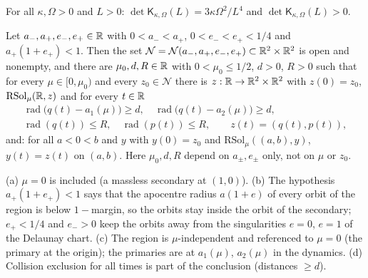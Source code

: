 \begin{theorem}\label{bpI:p0:kepler}
For all $\kappa,\Omega>0$ and $L>0$: $\det\mathsf K_{\kappa,\Omega}(L)=3\kappa\Omega^2/L^4$ and $\det\mathsf K_{\kappa,\Omega}(L)>0$.
\end{theorem}

\begin{theorem}\label{bpI:p0:r3bp}
Let $a_-,a_+,e_-,e_+\in\mathbb{R}$ with $0<a_-<a_+$, $0<e_-<e_+<1/4$ and $a_+(1+e_+)<1$. Then the set
$\mathcal N=\mathcal N(a_-,a_+,e_-,e_+)\subset\mathbb{R}^2\times\mathbb{R}^2$ is open and nonempty, and there are $\mu_0,d,R\in\mathbb{R}$ with
$0<\mu_0\le1/2$, $d>0$, $R>0$ such that for every $\mu\in[0,\mu_0)$ and every $z_0\in\mathcal N$ there is
$z:\mathbb{R}\to\mathbb{R}^2\times\mathbb{R}^2$ with $z(0)=z_0$, $\mathrm{RSol}_\mu(\mathbb{R},z)$ and for every $t\in\mathbb{R}$
\begin{gather*}
\operatorname{rad}\bigl(q(t)-a_1(\mu)\bigr)\ge d,\quad\operatorname{rad}\bigl(q(t)-a_2(\mu)\bigr)\ge d,\\
\operatorname{rad}(q(t))\le R,\quad\operatorname{rad}(p(t))\le R,\qquad z(t)=(q(t),p(t)),
\end{gather*}
and: for all $a<0<b$ and $y$ with $y(0)=z_0$ and $\mathrm{RSol}_\mu((a,b),y)$, $y(t)=z(t)$ on $(a,b)$.
Here $\mu_0,d,R$ depend on $a_\pm,e_\pm$ only, not on $\mu$ or $z_0$.
\end{theorem}

\begin{remark}[Reading of I-R3BP]\label{bpI:p0:r3bp-remarks}
(a) $\mu=0$ is included (a massless secondary at $(1,0)$). (b) The hypothesis $a_+(1+e_+)<1$ says that the
apocentre radius $a(1+e)$ of every orbit of the region is below $1-$margin, so the orbits stay inside the orbit of the
secondary; $e_+<1/4$ and $e_->0$ keep the orbits away from the singularities $e=0$, $e=1$ of the Delaunay chart. (c)
The region is $\mu$-independent and referenced to $\mu=0$ (the primary at the origin); the primaries are at
$a_1(\mu)$, $a_2(\mu)$ in the dynamics. (d) Collision exclusion for all times is part of the conclusion (distances $\ge d$).
\end{remark}
